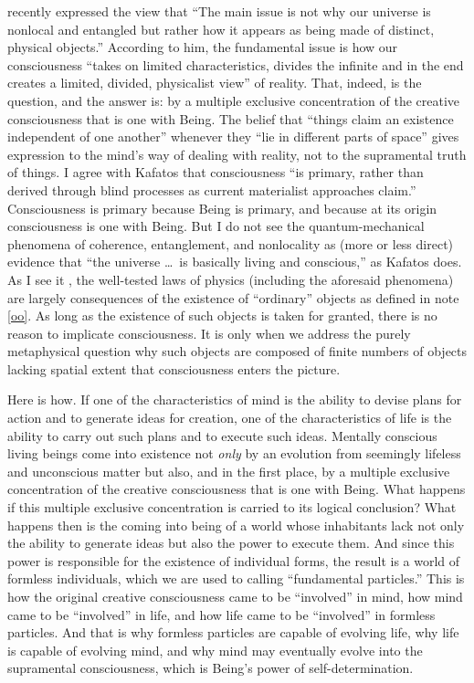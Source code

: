 \citet{Kafatos-spooky}  recently expressed the view that ``The main issue is not why our universe is nonlocal and entangled but rather how it appears as being made of distinct, physical objects.'' According to him, the fundamental issue is how our consciousness ``takes on limited characteristics, divides the infinite and in the end creates a limited, divided, physicalist view'' of reality. That, indeed, is the question, and the answer is: by a multiple exclusive concentration of the creative consciousness that is one with Being. The belief that ``things claim an existence independent of one another'' whenever they ``lie in different parts of space'' \citep{Einstein48} gives expression to the mind's way of dealing with reality, not to the supramental truth of things. I agree with Kafatos that consciousness ``is primary, rather than derived through blind processes as current materialist approaches claim.'' Consciousness is primary because Being is primary, and because at its origin consciousness is one with Being. But I do not see the quantum-mechanical phenomena of coherence, entanglement, and nonlocality as (more or less direct) evidence that ``the universe \dots\ is basically living and conscious,'' as Kafatos does. As I see it \citep{Mohrhoff2002,Mohrhoff2009b, Mohrhoff2011}, the well-tested laws of physics (including the aforesaid phenomena) are largely consequences of the existence of  ``ordinary'' objects as defined in note \ref{oo}. As long as the existence of such objects is taken for granted, there is no reason to implicate consciousness. It is only when we address the purely metaphysical question why such objects are composed of finite numbers of objects lacking spatial extent that  consciousness enters the picture.  

Here is how. If one of the characteristics of mind is the ability to devise plans for action and to generate ideas for creation, one of the characteristics of life is the ability to carry out such plans and to execute such ideas. Mentally conscious living beings come into existence not \emph{only} by an evolution from seemingly lifeless and unconscious matter but also, and in the first place, by a multiple exclusive concentration of the creative consciousness that is one with Being. What happens if this multiple exclusive concentration is carried to its logical conclusion? What happens then is the coming into  being of a world whose inhabitants lack not only the ability to generate ideas but also the power to execute them. And since this power is responsible for the existence of individual forms, the result is a world of formless individuals, which we are used to calling ``fundamental particles.'' This is how the original creative consciousness came to be ``involved'' in mind, how mind came to be ``involved'' in life, and how life came to be ``involved'' in formless particles. And that is why formless particles are capable of evolving life, why life is capable of evolving mind, and why mind may eventually evolve into the supramental consciousness, which is Being's power of self-determination.

